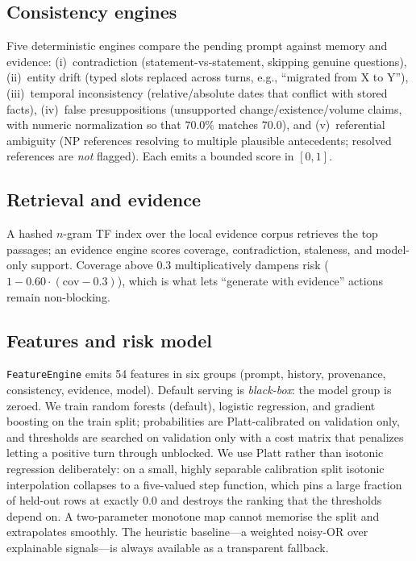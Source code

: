 \documentclass[10pt]{article}
\begin{document}
\subsection{Consistency engines}
Five deterministic engines compare the pending prompt against memory and
evidence: (i)~contradiction (statement-vs-statement, skipping genuine
questions), (ii)~entity drift (typed slots replaced across turns, e.g.,
``migrated from X to Y''), (iii)~temporal inconsistency (relative/absolute
dates that conflict with stored facts), (iv)~false presuppositions
(unsupported change/existence/volume claims, with numeric normalization so
that $70.0\%$ matches $70.0$), and (v)~referential ambiguity (NP references
resolving to multiple plausible antecedents; resolved references are
\emph{not} flagged). Each emits a bounded score in $[0,1]$.

\subsection{Retrieval and evidence}
A hashed $n$-gram TF index over the local evidence corpus retrieves the top
passages; an evidence engine scores coverage, contradiction, staleness, and
model-only support. Coverage above $0.3$ multiplicatively dampens risk
($1-0.60\cdot(\text{cov}-0.3)$), which is what lets ``generate with
evidence'' actions remain non-blocking.

\subsection{Features and risk model}
\texttt{FeatureEngine} emits 54 features in six groups (prompt, history,
provenance, consistency, evidence, model). Default serving is
\emph{black-box}: the model group is zeroed. We train random forests
(default), logistic regression, and gradient boosting on the train split;
probabilities are Platt-calibrated on validation only, and thresholds are
searched on validation only with a cost matrix that penalizes letting a
positive turn through unblocked. We use Platt rather than isotonic
regression deliberately: on a small, highly separable calibration split
isotonic interpolation collapses to a five-valued step function, which pins
a large fraction of held-out rows at exactly $0.0$ and destroys the ranking
that the thresholds depend on. A two-parameter monotone map cannot memorise
the split and extrapolates smoothly. The heuristic baseline---a weighted
noisy-OR over explainable signals---is always available as a transparent
fallback.
\end{document}
